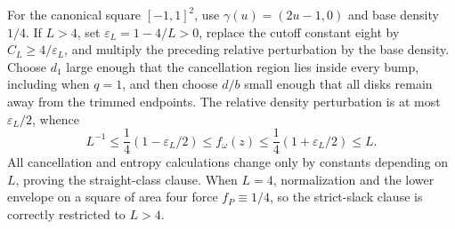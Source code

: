 For the canonical square \([-1,1]^2\), use \(\gamma(u)=(2u-1,0)\) and base density \(1/4\).  If \(L>4\), set \(\varepsilon_L=1-4/L>0\), replace the cutoff constant eight by \(C_L\geq4/\varepsilon_L\), and multiply the preceding relative perturbation by the base density.  Choose \(d_1\) large enough that the cancellation region lies inside every bump, including when \(q=1\), and then choose \(d/b\) small enough that all disks remain away from the trimmed endpoints.  The relative density perturbation is at most \(\varepsilon_L/2\), whence
\[
 L^{-1}\leq\frac14(1-\varepsilon_L/2)
 \leq f_\omega(z)
 \leq\frac14(1+\varepsilon_L/2)\leq L.
\]
All cancellation and entropy calculations change only by constants depending on \(L\), proving the straight-class clause.  When \(L=4\), normalization and the lower envelope on a square of area four force \(f_P\equiv1/4\), so the strict-slack clause is correctly restricted to \(L>4\).